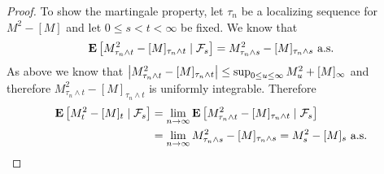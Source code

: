 \begin{proof}
To show the martingale property, let $\tau_n$ be a localizing sequence for $M^2 - [M]$ and let $0 \leq s < t < \infty$ be fixed.  We know that
\begin{align*}
\cexpectationlong{\mathcal{F}_s}{M^2_{\tau_n \wedge t} - [M]_{\tau_n \wedge t}} = M^2_{\tau_n \wedge s} - [M]_{\tau_n \wedge s} \text{ a.s.}
\end{align*}
As above we know that $\abs{M^2_{\tau_n \wedge t} - [M]_{\tau_n \wedge t}} \leq \sup_{0 \leq u \leq \infty} M^2_u + [M]_\infty$ and therefore $M^2_{\tau_n \wedge t} - [M]_{\tau_n \wedge t}$ is uniformly integrable.  Therefore
\begin{align*}
\cexpectationlong{\mathcal{F}_s}{M^2_{t} - [M]_{t}} 
&= \lim_{n \to \infty} \cexpectationlong{\mathcal{F}_s}{M^2_{\tau_n \wedge t} - [M]_{\tau_n \wedge t}} \\
&= \lim_{n \to \infty}   M^2_{\tau_n \wedge s} - [M]_{\tau_n \wedge s}  
= M^2_{s} - [M]_{s} \text{ a.s.}
\end{align*}
\end{proof}

